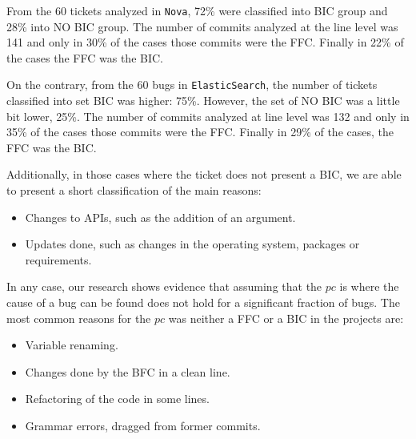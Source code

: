 \documentclass[conference]{IEEEtran}
\begin{document}
From the 60 tickets analyzed in \texttt{Nova}, 72\% were classified into BIC group and 28\% into NO BIC group.
The number of commits analyzed at the line level was 141 and only in 30\% of the cases those commits were the FFC. 
Finally in 22\% of the cases the FFC was the BIC.

On the contrary, from the 60 bugs in \texttt{ElasticSearch}, the number of tickets classified into set BIC was higher: 75\%.
However, the set of NO BIC was a little bit lower, 25\%.
The number of commits analyzed at line level was 132 and only in 35\% of the cases those commits were the FFC.
Finally in 29\% of the cases, the FFC was the BIC.


Additionally, in those cases where the ticket does not present a BIC, we are able to present a short classification of the main reasons:
\begin{itemize}
  \item Changes to APIs, such as the addition of an argument. 
  \item Updates done, such as changes in the operating system, packages or requirements.
\end{itemize}

In any case, our research shows evidence that assuming that the $pc$ is where the cause of a bug can be found does not hold for a significant fraction of bugs.
The most common reasons for the $pc$ was neither a FFC or a BIC in the projects are:

\begin{itemize}
  \item Variable renaming.
  \item Changes done by the BFC in a clean line.
  \item Refactoring of the code in some lines.
  \item Grammar errors, dragged from former commits.
\end{itemize} 
%
\end{document}
